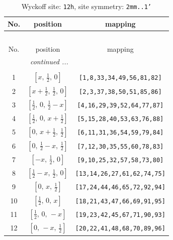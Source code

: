 \documentclass[fleqn,8pt]{jsarticle}
\begin{document}
\begin{longtable}{ccc}
\caption{Wyckoff site: {\tt 12h}, site symmetry: {\tt 2mm..1'}}
 \\
 \hline \hline
No. & position & mapping \\ \hline \endfirsthead

\multicolumn{2}{l}{\tablename\ \thetable{}} \\
 \hline \hline
No. & position & mapping \\ \hline \endhead

 \hline \hline
\multicolumn{2}{r}{\footnotesize\it continued ...} \\ \endfoot

 \hline \hline
\multicolumn{2}{r}{} \\ \endlastfoot

1 & $\left[ x,\, \frac{1}{2},\, 0 \right]$ & {\tt [1,8,33,34,49,56,81,82]} \\ \hline
2 & $\left[ x + \frac{1}{2},\, \frac{1}{2},\, 0 \right]$ & {\tt [2,3,37,38,50,51,85,86]} \\ \hline
3 & $\left[ \frac{1}{2},\, 0,\, \frac{1}{2} - x \right]$ & {\tt [4,16,29,39,52,64,77,87]} \\ \hline
4 & $\left[ \frac{1}{2},\, 0,\, x + \frac{1}{2} \right]$ & {\tt [5,15,28,40,53,63,76,88]} \\ \hline
5 & $\left[ 0,\, x + \frac{1}{2},\, \frac{1}{2} \right]$ & {\tt [6,11,31,36,54,59,79,84]} \\ \hline
6 & $\left[ 0,\, \frac{1}{2} - x,\, \frac{1}{2} \right]$ & {\tt [7,12,30,35,55,60,78,83]} \\ \hline
7 & $\left[ - x,\, \frac{1}{2},\, 0 \right]$ & {\tt [9,10,25,32,57,58,73,80]} \\ \hline
8 & $\left[ \frac{1}{2} - x,\, \frac{1}{2},\, 0 \right]$ & {\tt [13,14,26,27,61,62,74,75]} \\ \hline
9 & $\left[ 0,\, x,\, \frac{1}{2} \right]$ & {\tt [17,24,44,46,65,72,92,94]} \\ \hline
10 & $\left[ \frac{1}{2},\, 0,\, x \right]$ & {\tt [18,21,43,47,66,69,91,95]} \\ \hline
11 & $\left[ \frac{1}{2},\, 0,\, - x \right]$ & {\tt [19,23,42,45,67,71,90,93]} \\ \hline
12 & $\left[ 0,\, - x,\, \frac{1}{2} \right]$ & {\tt [20,22,41,48,68,70,89,96]} \\
\end{longtable}
\renewcommand{\arraystretch}{1.2}
\end{document}
